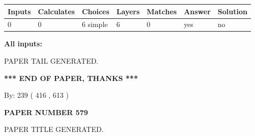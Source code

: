 \documentclass{ctexart}
\begin{document}
 
   
   
   
   
\noindent\begin{tabular}{|l|l|l|l|l|l|l|}
 \hline
Inputs & Calculates & Choices & Layers & Matches & Answer & Solution \\ \hline
 0  & 
 0  & 
 6
  simple  
  & 
 6  & 
 0  & 
  yes & 
  no 
  \\ \hline
 \end{tabular}
   
   
   
   
\noindent{}
   
   
   
   
\noindent\vspace{0.1in}\hspace{-0.08in} {\textbf{\Large{All inputs: }}}
   
   
   
   
   
   
 \vspace{0.2in}
 
   
   
\vspace{2.0in} PAPER TAIL GENERATED.
   
   
   
   
\vspace{1.0in} 
{\textbf{\large{ *** END OF PAPER, THANKS *** }}} 
   
   
\hspace{1.0in} By: 
 239 ( 416 ,  613 )
   
   
   
   
\newpage 
\setcounter{page}{ 
   579001 } 
   
   
   
   
 {\textbf{ \Large{ PAPER NUMBER  579  }}}
   
   
\vspace{0.2in}
   
   
   
   
   
   
   
   
 \vspace{0.2in}
 
 
 
 
   
   
 PAPER TITLE GENERATED.
   
\end{document}
